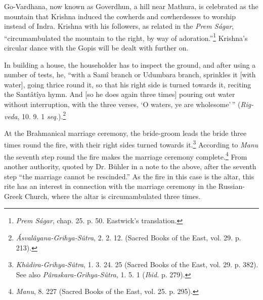 \documentclass[a4paper, 11pt, oneside, polutonikogreek, english]{article}
\begin{document}
Go-Vardhana, now known as Goverdhun, a hill near Mathura, is celebrated as the mountain that Krishna induced the cowherds and cowherdesses to worship instead of Indra. Krishna with his followers, as related in the \emph{Prem Ságar}, ``circumambulated the mountain to the right, by way of adoration.''\footnote{\emph{Prem Ságar}, chap. 25. p. 50. Eastwick's translation.} Krishna's circular dance with the Gopis will be dealt with further on.

In building a house, the householder has to inspect the ground, and after using a number of tests, he, ``with a Samî branch or Udumbara branch, sprinkles it [with water], going thrice round it, so that his right side is turned towards it, reciting the Santâtîya hymn. And [so he does again three times] pouring out water without interruption, with the three verses, `O waters, ye are wholesome'\,'' (\emph{Rig-veda}, 10. 9. 1 \emph{seq.}).\footnote{\emph{Ásvalâyana-Grihya-Sûtra}, 2. 2. 12. (Sacred Books of the East, vol. 29. p. 213).}

At the Brahmanical marriage ceremony, the bride-groom leads the bride three times round the fire, with their right sides turned towards it.\footnote{\emph{Khâdira-Grihya-Sûtra}, 1. 3. 24. 25 (Sacred Books of the East, vol. 29. p. 382). See also \emph{Pâraskara-Grihya-Sûtra}, 1. 5. 1 (\emph{Ibid.} p. 279).} According to \emph{Manu} the seventh step round the fire makes the marriage ceremony complete.\footnote{\emph{Manu}, 8. 227 (Sacred Books of the East, vol. 25. p. 295).} From another authority, quoted by Dr. Bühler in a note to the above, after the seventh step ``the marriage cannot be rescinded.'' As the fire in this case is the altar, this rite has an interest in connection with the marriage ceremony in the Russian-Greek Church, where the altar is circumambulated three times.
\end{document}
